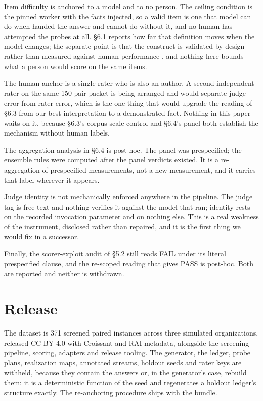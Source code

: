\documentclass[11pt]{article}
\begin{document}
Item difficulty is anchored to a model and to no person. The ceiling condition
is the pinned worker with the facts injected, so a valid item is one that
model can do when handed the answer and cannot do without it, and no human has
attempted the probes at all. \S6.1 reports how far that definition moves when
the model changes; the separate point is that the construct is validated by
design rather than measured against human performance \cite{construct}, and
nothing here bounds what a person would score on the same items.

The human anchor is a single rater who is also an author. A second independent
rater on the same 150-pair packet is being arranged and would separate judge
error from rater error, which is the one thing that would upgrade the reading
of \S6.3 from our best interpretation to a demonstrated fact. Nothing in this
paper waits on it, because \S6.3's corpus-scale control and \S6.4's panel both
establish the mechanism without human labels.

The aggregation analysis in \S6.4 is post-hoc. The panel was prespecified; the
ensemble rules were computed after the panel verdicts existed. It is a
re-aggregation of prespecified measurements, not a new measurement, and it
carries that label wherever it appears.

Judge identity is not mechanically enforced anywhere in the pipeline. The
judge tag is free text and nothing verifies it against the model that ran;
identity rests on the recorded invocation parameter and on nothing else. This
is a real weakness of the instrument, disclosed rather than repaired, and it
is the first thing we would fix in a successor.

Finally, the scorer-exploit audit of \S5.2 still reads FAIL under its literal
prespecified clause, and the re-scoped reading that gives PASS is post-hoc.
Both are reported and neither is withdrawn.

\section{Release}

The dataset is 371 screened paired instances across three simulated
organizations, released CC BY 4.0 with Croissant and RAI metadata, alongside
the screening pipeline, scoring, adapters and release tooling. The generator,
the ledger, probe plans, realization maps, annotated streams, holdout seeds and
rater keys are withheld, because they contain the answers or, in the
generator's case, rebuild them: it is a deterministic function of the seed and
regenerates a holdout ledger's structure exactly. The re-anchoring procedure
ships with the bundle.
\end{document}
